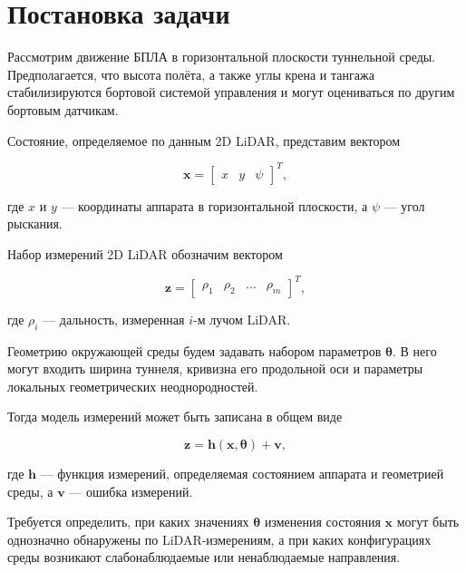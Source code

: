 \documentclass{misisarticle}
\begin{document}
\section{Постановка задачи}

Рассмотрим движение БПЛА в горизонтальной плоскости туннельной
среды. Предполагается, что высота полёта, а также углы крена
и тангажа стабилизируются бортовой системой управления и могут
оцениваться по другим бортовым датчикам.

Состояние, определяемое по данным 2D LiDAR, представим вектором

\begin{equation}
    \mathbf{x} =
    \begin{bmatrix}
        x & y & \psi
    \end{bmatrix}^{T},
    \label{eq:state}
\end{equation}

где $x$ и $y$ --- координаты аппарата в горизонтальной плоскости,
а $\psi$ --- угол рыскания.

Набор измерений 2D LiDAR обозначим вектором

\begin{equation}
    \mathbf{z} =
    \begin{bmatrix}
        \rho_1 & \rho_2 & \ldots & \rho_m
    \end{bmatrix}^{T},
    \label{eq:measurements}
\end{equation}

где $\rho_i$ --- дальность, измеренная $i$-м лучом LiDAR.

Геометрию окружающей среды будем задавать набором параметров
$\boldsymbol{\theta}$. В него могут входить ширина туннеля,
кривизна его продольной оси и параметры локальных геометрических
неоднородностей.

Тогда модель измерений может быть записана в общем виде

\begin{equation}
    \mathbf{z}
    =
    \mathbf{h}(\mathbf{x},\boldsymbol{\theta})
    +
    \mathbf{v},
    \label{eq:model}
\end{equation}

где $\mathbf{h}$ --- функция измерений, определяемая состоянием
аппарата и геометрией среды, а $\mathbf{v}$ --- ошибка измерений.

Требуется определить, при каких значениях
$\boldsymbol{\theta}$ изменения состояния $\mathbf{x}$
могут быть однозначно обнаружены по LiDAR-измерениям,
а при каких конфигурациях среды возникают слабонаблюдаемые
или ненаблюдаемые направления.
\end{document}
